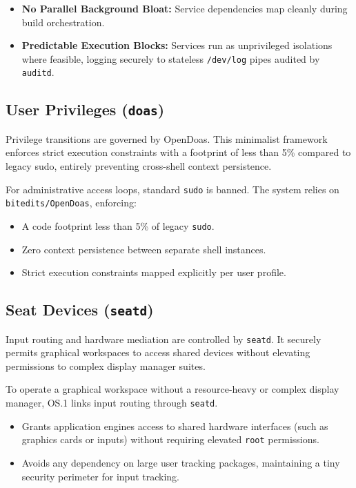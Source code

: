 \documentclass{article}
\begin{document}
\begin{itemize}
    \item \textbf{No Parallel Background Bloat:} Service dependencies map cleanly during build orchestration.
    \item \textbf{Predictable Execution Blocks:} Services run as unprivileged isolations where feasible, logging securely to stateless \texttt{/dev/log} pipes audited by \texttt{auditd}.
\end{itemize}

\subsection{User Privileges (\texttt{doas})}
Privilege transitions are governed by OpenDoas. This minimalist framework enforces strict execution constraints with a footprint of less than 5\% compared to legacy sudo, entirely preventing cross-shell context persistence.

For administrative access loops, standard \texttt{sudo} is banned. The system relies on \texttt{bitedits/OpenDoas}, enforcing:
\begin{itemize}
\item A code footprint less than 5\% of legacy \texttt{sudo}.
\item Zero context persistence between separate shell instances.
\item Strict execution constraints mapped explicitly per user profile.
\end{itemize}

\newpage
\subsection{Seat Devices (\texttt{seatd})}
Input routing and hardware mediation are controlled by \texttt{seatd}. It securely permits graphical workspaces to access shared devices without elevating permissions to complex display manager suites.

To operate a graphical workspace without a resource-heavy or complex display manager, OS.1 links input routing through \texttt{seatd}.
\begin{itemize}
\item Grants application engines access to shared hardware interfaces (such as graphics cards or inputs) without requiring elevated \texttt{root} permissions.
\item Avoids any dependency on large user tracking packages, maintaining a tiny security perimeter for input tracking.
\end{itemize}
\end{document}
